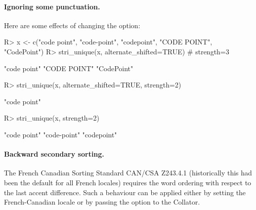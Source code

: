 \documentclass[nojss]{jss}\usepackage[]{graphicx}\usepackage[]{color}
\begin{document}
\paragraph{Ignoring some punctuation.}
Here are some effects of changing the   option:


\begin{Schunk}
\begin{Sinput}
R> x <- c("code point", "code-point", "codepoint", "CODE POINT", "CodePoint")
R> stri_unique(x, alternate_shifted=TRUE)  # strength=3
\end{Sinput}
\begin{Soutput}
[1] "code point" "CODE POINT" "CodePoint"
\end{Soutput}
\begin{Sinput}
R> stri_unique(x, alternate_shifted=TRUE, strength=2)
\end{Sinput}
\begin{Soutput}
[1] "code point"
\end{Soutput}
\begin{Sinput}
R> stri_unique(x, strength=2)
\end{Sinput}
\begin{Soutput}
[1] "code point" "code-point" "codepoint"
\end{Soutput}
\end{Schunk}



%
%
%
%
%
%
%
%




\paragraph{Backward secondary sorting.}
The French Canadian Sorting Standard CAN/CSA Z243.4.1 (historically this had been
the default for all French locales) requires the word ordering with respect
to  the last accent difference. Such a behaviour can be applied
either by setting the French-Canadian locale or by passing the 
option to the Collator.
\end{document}
